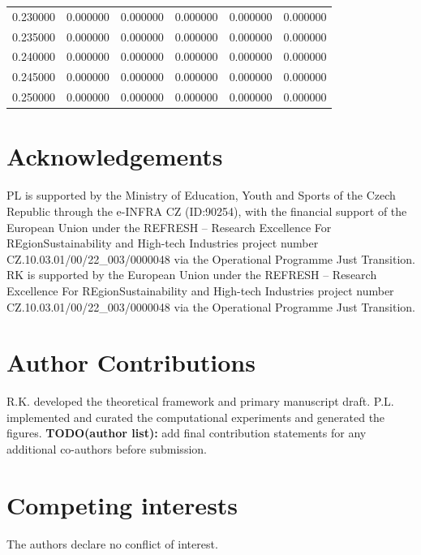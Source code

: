 \documentclass[a4paper,twocolumn,11pt,unpublished]{quantumarticle}
\begin{document}
\begin{table}[p]
\begin{tabular}{cccccc}
0.230000 & 0.000000 & 0.000000 & 0.000000 & 0.000000 & 0.000000 \\
0.235000 & 0.000000 & 0.000000 & 0.000000 & 0.000000 & 0.000000 \\
0.240000 & 0.000000 & 0.000000 & 0.000000 & 0.000000 & 0.000000 \\
0.245000 & 0.000000 & 0.000000 & 0.000000 & 0.000000 & 0.000000 \\
0.250000 & 0.000000 & 0.000000 & 0.000000 & 0.000000 & 0.000000 \\
\hline
\end{tabular}
\end{table}

\clearpage



\section*{Acknowledgements}
  PL is supported by the Ministry of Education, Youth and Sports of the Czech
Republic through the e-INFRA CZ (ID:90254), with the financial support of the
European Union under the REFRESH – Research Excellence For
REgionSustainability and
High-tech Industries project number CZ.10.03.01/00/22\_003/0000048 via the
Operational Programme Just Transition.  
RK is supported by the European Union under the REFRESH – Research Excellence
For REgionSustainability and
High-tech Industries project number CZ.10.03.01/00/22\_003/0000048 via the
Operational Programme Just Transition.  
\section*{Author Contributions}
R.K. developed the theoretical framework and primary manuscript draft. P.L.
implemented and curated the computational experiments and generated the figures.
\textbf{TODO(author list):} add final contribution statements for any additional
co-authors before submission.
\section*{Competing interests}
The authors declare no conflict of interest.
\end{document}
